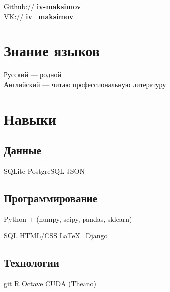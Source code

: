 \documentclass[a4paper]{resume}
\begin{document}
\begin{minipage}[t]{0.33\textwidth}
Github:// \href{https://github.com/iv-maksimov}{\bf iv-maksimov} \\
VK:// \href{http://vk.com/iv\_maksimov}{\bf iv\_maksimov}

\sectionspace %


\section{Знание языков}
Русский — родной \\
Английский — читаю профессиональную литературу



\sectionspace %


\section{Навыки}

\subsection{Данные}
SQLite \textbullet{} PostgreSQL \textbullet {}JSON
\sectionspace

\subsection{Программирование}

Python + (numpy, scipy, pandas, sklearn)

SQL \textbullet{} HTML/CSS \textbullet{} \LaTeX\ \textbullet{} Django

\sectionspace

\subsection{Технологии}

git \textbullet{}  R \textbullet{} Octave \textbullet{} CUDA (Theano)

\sectionspace



\end{minipage}
\end{document}
